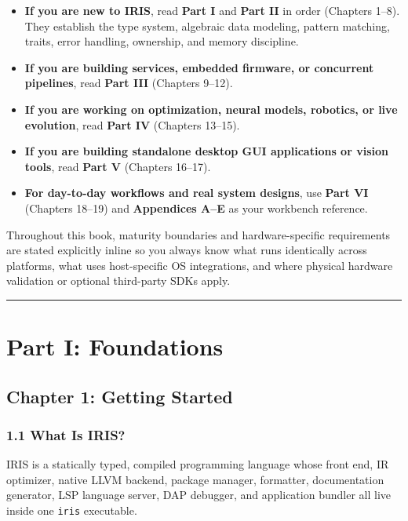 \documentclass[
  english,
  oneside]{book}
\providecommand{\tightlist}{%
  \setlength{\itemsep}{0pt}\setlength{\parskip}{0pt}}
\begin{document}
\begin{itemize}
\tightlist
\item
  \textbf{If you are new to IRIS}, read \textbf{Part I} and \textbf{Part
  II} in order (Chapters 1--8). They establish the type system,
  algebraic data modeling, pattern matching, traits, error handling,
  ownership, and memory discipline.
\item
  \textbf{If you are building services, embedded firmware, or concurrent
  pipelines}, read \textbf{Part III} (Chapters 9--12).
\item
  \textbf{If you are working on optimization, neural models, robotics,
  or live evolution}, read \textbf{Part IV} (Chapters 13--15).
\item
  \textbf{If you are building standalone desktop GUI applications or
  vision tools}, read \textbf{Part V} (Chapters 16--17).
\item
  \textbf{For day-to-day workflows and real system designs}, use
  \textbf{Part VI} (Chapters 18--19) and \textbf{Appendices A--E} as
  your workbench reference.
\end{itemize}

Throughout this book, maturity boundaries and hardware-specific
requirements are stated explicitly inline so you always know what runs
identically across platforms, what uses host-specific OS integrations,
and where physical hardware validation or optional third-party SDKs
apply.

\begin{center}\rule{0.5\linewidth}{0.5pt}\end{center}

\part{Part I: Foundations}\label{part-i-foundations}

\chapter{Chapter 1: Getting Started}\label{chapter-1-getting-started}

\section{1.1 What Is IRIS?}\label{what-is-iris}

IRIS is a statically typed, compiled programming language whose front
end, IR optimizer, native LLVM backend, package manager, formatter,
documentation generator, LSP language server, DAP debugger, and
application bundler all live inside one \texttt{iris} executable.
\end{document}
